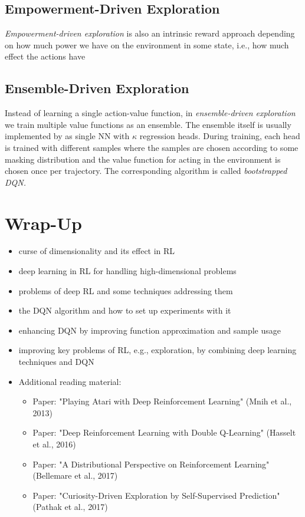 		\subsection{Empowerment-Driven Exploration}
			\emph{Empowerment-driven exploration} is also an intrinsic reward approach depending on how much power we have on the environment in some state, i.e., how much effect the actions have

		\subsection{Ensemble-Driven Exploration}
			Instead of learning a single action-value function, in \emph{ensemble-driven exploration} we train multiple value functions as an ensemble. The ensemble itself is usually implemented by as single \ac{NN} with \(\kappa\) regression heads. During training, each head is trained with different samples where the samples are chosen according to some masking distribution and the value function for acting in the environment is chosen once per trajectory. The corresponding algorithm is called \emph{bootstrapped \ac{DQN}.}

	\section{Wrap-Up}
		\begin{itemize}
			\item curse of dimensionality and its effect in \ac{RL}
			\item deep learning in \ac{RL} for handling high-dimensional problems
			\item problems of deep \ac{RL} and some techniques addressing them
			\item the \ac{DQN} algorithm and how to set up experiments with it
			\item enhancing \ac{DQN} by improving function approximation and sample usage
			\item improving key problems of \ac{RL}, e.g., exploration, by combining deep learning techniques and \ac{DQN}
			\item Additional reading material:
				\begin{itemize}
					\item Paper: "Playing Atari with Deep Reinforcement Learning" (Mnih et al., 2013)  %
					\item Paper: "Deep Reinforcement Learning with Double Q-Learning" (Hasselt et al., 2016)  %
					\item Paper: "A Distributional Perspective on Reinforcement Learning" (Bellemare et al., 2017)  %
					\item Paper: "Curiosity-Driven Exploration by Self-Supervised Prediction" (Pathak et al., 2017)  %
				\end{itemize}
		\end{itemize}

